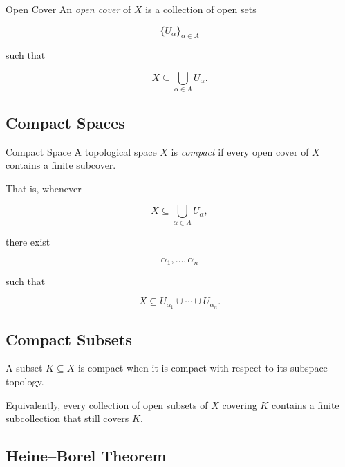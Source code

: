 \begin{definitionbox}{Open Cover}
An \emph{open cover} of \(X\) is a collection of open sets

\[
\{U_\alpha\}_{\alpha\in A}
\]

such that

\[
\boxed{
X
\subseteq
\bigcup_{\alpha\in A}U_\alpha.
}
\]
\end{definitionbox}

\subsection{Compact Spaces}
\label{subsec:compact-spaces}

\begin{definitionbox}{Compact Space}
A topological space \(X\) is \emph{compact} if every open cover of \(X\)
contains a finite subcover.
\end{definitionbox}

That is, whenever

\[
X\subseteq
\bigcup_{\alpha\in A}U_\alpha,
\]

there exist

\[
\alpha_1,\ldots,\alpha_n
\]

such that

\[
\boxed{
X
\subseteq
U_{\alpha_1}\cup\cdots\cup U_{\alpha_n}.
}
\]

\subsection{Compact Subsets}
\label{subsec:compact-subsets}

A subset \(K\subseteq X\) is compact when it is compact with respect to its
subspace topology.

Equivalently, every collection of open subsets of \(X\) covering \(K\)
contains a finite subcollection that still covers \(K\).

\subsection{Heine--Borel Theorem}
\label{subsec:heine-borel-topology}

